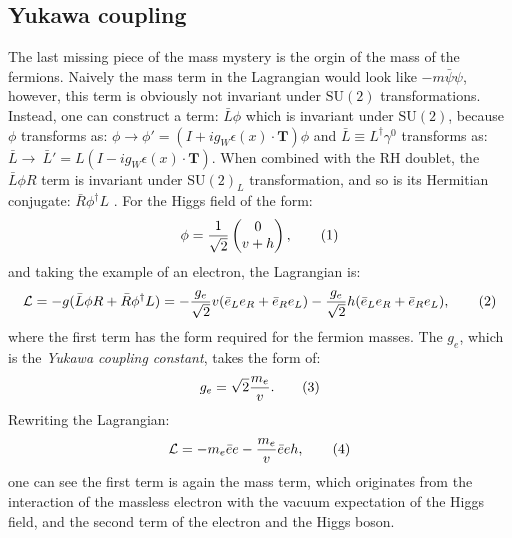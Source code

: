 \subsection{Yukawa coupling}
The last missing piece of the mass mystery is the orgin of the mass
of the fermions.
Naively the mass term in the Lagrangian would look like $-m\bar{\psi} \psi$, 
however, this term is obviously not invariant under $\text{SU}(2)$ transformations. 
Instead, one can construct a term: $\bar{L}\phi$ which is invariant under $\text{SU}(2)$,
because $\phi$ transforms as: $\phi \rightarrow \phi' = (I +  ig_W \epsilon(x)\cdot \textbf{T} ) \phi$
and $\bar{L} \equiv L^\dagger \gamma^0$ transforms as:
$\bar{L} \rightarrow \ \bar{L}' = L(I -  ig_W \epsilon(x)\cdot \textbf{T} )$.
When combined with the RH doublet, the 
$\bar{L}\phi R$ term is invariant under  $\text{SU}(2)_L$ transformation, and 
so is its Hermitian conjugate: $\bar{R}\phi^\dagger L$ .
For the Higgs field of the form:
\[
 \phi = \frac{1}{\sqrt{2}} \begin{pmatrix}0 \\ v + h\\ \end{pmatrix},
\addtag \]
and taking the example of an electron, 
the Lagrangian is:
\[
\mathcal{L} = -g(\bar{L}\phi R + \bar{R}\phi^\dagger L ) = -\frac{g_e}{\sqrt{2}}v(\bar{e}_L e_R + \bar{e}_R e_L) - \frac{g_e}{\sqrt{2}}h(\bar{e}_L e_R+ \bar{e}_R e_L),
\addtag \]
where the first term has the form required for the fermion masses.
The $g_e$, which is the \textit{Yukawa coupling constant}, takes the form of:
\[
g_e = \sqrt{2} \frac{m_e}{v}.
\addtag \]
Rewriting the Lagrangian:
\[
    \mathcal{L} = -m_e \bar{e}e - \frac{m_e}{v}\bar{e}eh,
    \addtag \]
one can see the first term is again the mass term, which originates from the 
interaction of the massless electron with the vacuum expectation of the Higgs field, 
and the second term of the electron and the Higgs boson.

